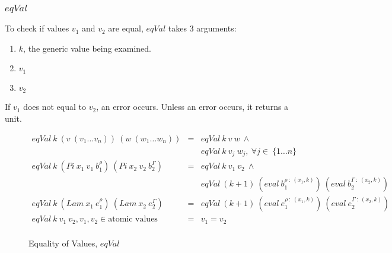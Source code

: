 \documentclass[acmsmall]{acmart}
\begin{document}
\subsubsection{$eqVal$}

To check if values $v_1$ and $v_2$ are equal, $eqVal$ takes 3 arguments:

\begin{enumerate}
  \item $k$, the generic value being examined.
  \item $v_1$
  \item $v_2$
\end{enumerate}

If $v_1$ does not equal to $v_2$, an error occurs. Unless an error occurs, it returns a unit.

\begin{figure}[H]
  \begin{equation*}
    \begin{aligned}
      eqVal \: k \: (v \: (v_1 \dots v_n)) \: (w \: (w_1 \dots w_n))                       & = & eqVal \: k \:v \: w \: \land                                                                     \\                                                                  
                                                                                           &   & eqVal \: k \: v_j \: w_j, \: \forall j \in \: \{1 \dots n\}                                      \\
      eqVal \: k \: (Pi \: x_1 \: v_1 \: b_1^{\rho}) \: (Pi \: x_2 \: v_2 \: b_2^{\Gamma}) & = & eqVal \: k \: v_1 \: v_2 \: \land                                                                \\                                                
                                                                                           &   & eqVal \: (k+1) \: (eval \: b_1^{\rho \: : \: (x_1,k)}) \: (eval \: b_2^{\Gamma \: : \: (x_2,k)}) \\
      eqVal \: k \: (Lam \: x_1 \: e_1^{\rho}) \: (Lam \: x_2 \: e_2^{\Gamma})             & = & eqVal \: (k+1) \: (eval \: e_1^{\rho \: : \: (x_1,k)}) \: (eval \: e_2^{\Gamma \: : \: (x_2,k)}) \\
      eqVal \: k \: v_1 \: v_2, v_1,v_2 \in \textrm{atomic values}                         & = & v_1 = v_2                                                                                        \\
    \end{aligned}
  \end{equation*}
  \caption{Equality of Values, $eqVal$}
\end{figure}
\end{document}
